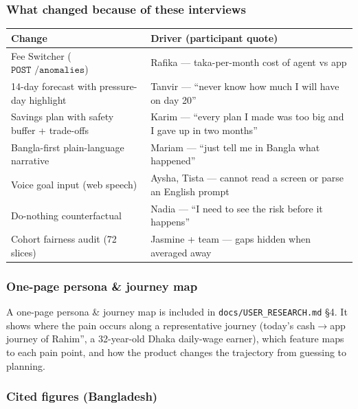 \documentclass[11pt, a4paper]{article}
\begin{document}
\subsubsection*{What changed because of these interviews}

\begin{table}[h]
\centering
\begin{tabular}{@{}p{4.5cm}p{5.5cm}@{}}
\toprule
\textbf{Change} & \textbf{Driver (participant quote)} \\ \midrule
Fee Switcher ($\texttt{POST /anomalies}$) & Rafika --- taka-per-month cost of agent vs app \\
14-day forecast with pressure-day highlight & Tanvir --- \textquotedblleft never know how much I will have on day 20\textquotedblright \\
Savings plan with safety buffer + trade-offs & Karim --- \textquotedblleft every plan I made was too big and I gave up in two months\textquotedblright \\
Bangla-first plain-language narrative & Mariam --- \textquotedblleft just tell me in Bangla what happened\textquotedblright \\
Voice goal input (web speech) & Aysha, Tista --- cannot read a screen or parse an English prompt \\
Do-nothing counterfactual & Nadia --- \textquotedblleft I need to see the risk before it happens\textquotedblright \\
Cohort fairness audit (72 slices) & Jasmine + team --- gaps hidden when averaged away \\ \bottomrule
\end{tabular}
\end{table}

\subsubsection*{One-page persona \& journey map}

A one-page persona \& journey map is included in
\texttt{docs/USER_RESEARCH.md} \S4. It shows where the pain occurs along a
representative journey (today's cash$\rightarrow$app journey of \textquotedleft
Rahim\textquotedblright, a 32-year-old Dhaka daily-wage earner), which feature
maps to each pain point, and how the product changes the trajectory from guessing
to planning.

\subsubsection*{Cited figures (Bangladesh)}
\end{document}
